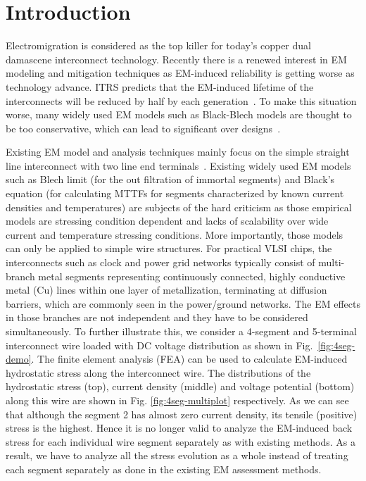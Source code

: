 \section{Introduction}
\label{sec:intro}

Electromigration is considered as the top killer for today's copper dual
damascene interconnect technology. Recently there is a renewed
interest in EM modeling and mitigation techniques as EM-induced
reliability is getting worse as technology advance.  ITRS predicts that
the EM-induced lifetime of the interconnects will be reduced by half
by each generation~\cite{ITRS}. To make this situation worse,
many widely used EM models such as Black-Blech models are thought to
be too conservative, which can lead to significant over
designs~\cite{Bailey:semieng}.

Existing EM model and analysis techniques mainly focus on the simple
straight line interconnect with two line end
terminals~\cite{deOrio:2010}.  Existing widely used EM models such as
Blech limit \cite{Blech:1976ko} (for the out filtration of immortal
segments) and Black's equation \cite{Black:1969fc} (for calculating
MTTFs for segments characterized by known current densities and
temperatures) are subjects of the hard criticism
\cite{Ohring:1998uj}\cite{Lloyd:2008je}\cite{Hauschildt:2013cv} as
those empirical models are stressing condition dependent and lacks of
scalability over wide current and temperature stressing
conditions. More importantly, those models can only be applied to
simple wire structures.  For practical VLSI chips, the interconnects
such as clock and power grid networks typically consist of
multi-branch metal segments representing continuously connected,
highly conductive metal (Cu) lines within one layer of metallization,
terminating at diffusion barriers, which are commonly seen in the
power/ground networks.  The EM effects in those branches are not
independent and they have to be considered simultaneously.  To further
illustrate this, we consider a 4-segment and 5-terminal interconnect
wire loaded with DC voltage distribution as shown in
Fig.~\ref{fig:4seg-demo}. The finite element analysis (FEA) can be
used to calculate EM-induced hydrostatic stress along the interconnect
wire.  The distributions of the hydrostatic stress (top), current
density (middle) and voltage potential (bottom) along this wire are
shown in Fig. \ref{fig:4seg-multiplot} respectively. As we can see
that although the segment 2 has almost zero current density, its
tensile (positive) stress is the highest. Hence it is no longer valid
to analyze the EM-induced back stress for each individual wire
segment separately as with existing methods. As a result, we have to
analyze all the stress evolution as a whole instead of treating each
segment separately as done in the existing EM assessment methods.

